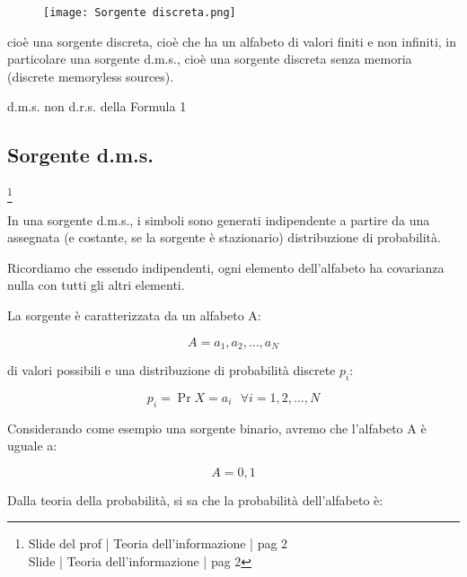 \begin{figure}[h]
    \centering
    \texttt{[image: Sorgente discreta.png]}
\end{figure}

cioè una sorgente discreta, cioè che ha un alfabeto di valori finiti e non infiniti, in particolare una sorgente d.m.s., 
cioè una sorgente discreta senza memoria (discrete memoryless sources). \newline 

\begin{tcolorbox}
    d.m.s. non d.r.s. della Formula 1 
\end{tcolorbox}

\newpage 

\subsection{Sorgente d.m.s.}
\footnote{Slide del prof | Teoria dell'informazione | pag 2 \\  
Slide | Teoria dell'informazione | pag 2 
}

In una sorgente d.m.s., i simboli sono generati indipendente a partire da una assegnata (e costante, se la sorgente è stazionario) distribuzione di probabilità. \newline 

Ricordiamo che essendo indipendenti, ogni elemento dell'alfabeto ha covarianza nulla con tutti gli altri elementi. \newline 

La sorgente è caratterizzata da un alfabeto A: 

{
    \Large 
    \begin{equation}
        A = {a_1, a_2, \dots, a_N}
    \end{equation}
}


di valori possibili e una distribuzione di probabilità discrete $p_i$: 

{
    \Large 
    \begin{equation}
        p_i = \Pr{X = a_i} \text{ } \forall i = 1, 2, \dots, N
    \end{equation}
}

Considerando come esempio una sorgente binario, avremo che l'alfabeto A è uguale a: 

{
    \Large
    \begin{equation}
        A = {0, 1}
    \end{equation}
}

Dalla teoria della probabilità, si sa che la probabilità dell'alfabeto è: 

